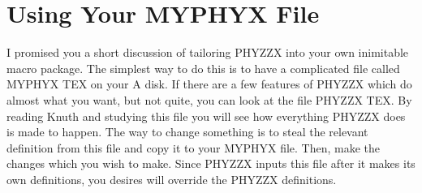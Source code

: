 \section{Using Your MYPHYX File}
 
I promised you a short discussion of tailoring PHYZZX
into your own inimitable macro package.
The simplest way to do this is to have a complicated
file called MYPHYX TEX on your A disk.
If there are a few features of PHYZZX which do almost what you
want, but not quite, you can
look at the file PHYZZX TEX.
By reading Knuth and studying this file you will see how
everything PHYZZX does is made to happen.
The way to change something is to steal the relevant definition
from this file and copy it to your MYPHYX file.
Then, make the changes which you wish to make.
Since PHYZZX inputs this file after it makes its own
definitions, you desires will override the PHYZZX definitions.
 
 
\bye
 
